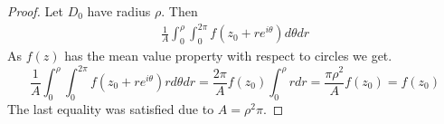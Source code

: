 \documentclass[letter,12pt,reqno]{article}
\begin{document}
\begin{proof}
    Let $D_0$ have radius $\rho$. Then 
    \begin{align*}
    \frac{1}{A}\int_0^\rho\int_0^{2\pi}f(z_0+re^{i\theta})d\theta dr
    \end{align*}
    As $f(z)$ has the mean value property with respect to circles we get.
    \[
        \frac{1}{A}\int_0^\rho\int_0^{2\pi}f(z_0+re^{i\theta})rd\theta dr
        =\frac{2\pi}{A}f(z_0) \int_0^\rho r dr=\frac{\pi\rho^2}{A}f(z_0) =f(z_0)
    \]
    The last equality was satisfied due to $A=\rho^2 \pi$.
\end{proof}
\end{document}
